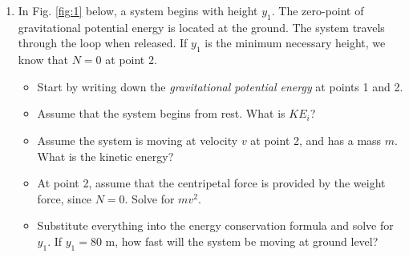 \documentclass{article}
\begin{document}
\begin{enumerate}
\item In Fig. \ref{fig:1} below, a system begins with height $y_1$.  The zero-point of gravitational potential energy is located at the ground.  The system travels through the loop when released.  If $y_1$ is the minimum necessary height, we know that $N = 0$ at point 2.
\begin{itemize}
\item Start by writing down the \textit{gravitational potential energy} at points 1 and 2. \\ \vspace{1cm}
\item Assume that the system begins from rest.  What is $KE_i$? \\ \vspace{1cm}
\item Assume the system is moving at velocity $v$ at point 2, and has a mass $m$.  What is the kinetic energy? \\ \vspace{1cm}
\item At point 2, assume that the centripetal force is provided by the weight force, since $N = 0$.  Solve for $m v^2$. \\ \vspace{1cm}
\item Substitute everything into the energy conservation formula and solve for $y_1$.  If $y_1 = 80$ m, how fast will the system be moving at ground level?
\end{itemize}
\end{enumerate}
\end{document}
